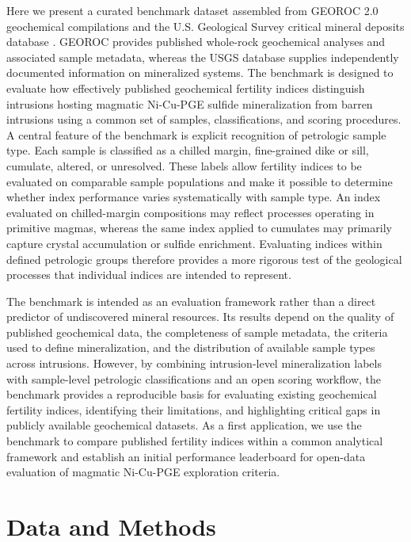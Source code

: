 \documentclass[10pt,twocolumn,letterpaper]{article}
\begin{document}
Here we present a curated benchmark dataset assembled from GEOROC 2.0 geochemical compilations \cite{lehnert2000,worner2024,digis2026} and the U.S. Geological Survey critical mineral deposits database \cite{hammarstrom2023}. GEOROC provides published whole-rock geochemical analyses and associated sample metadata, whereas the USGS database supplies independently documented information on mineralized systems. The benchmark is designed to evaluate how effectively published geochemical fertility indices distinguish intrusions hosting magmatic Ni-Cu-PGE sulfide mineralization from barren intrusions using a common set of samples, classifications, and scoring procedures. A central feature of the benchmark is explicit recognition of petrologic sample type. Each sample is classified as a chilled margin, fine-grained dike or sill, cumulate, altered, or unresolved. These labels allow fertility indices to be evaluated on comparable sample populations and make it possible to determine whether index performance varies systematically with sample type. An index evaluated on chilled-margin compositions may reflect processes operating in primitive magmas, whereas the same index applied to cumulates may primarily capture crystal accumulation or sulfide enrichment. Evaluating indices within defined petrologic groups therefore provides a more rigorous test of the geological processes that individual indices are intended to represent.

The benchmark is intended as an evaluation framework rather than a direct predictor of undiscovered mineral resources. Its results depend on the quality of published geochemical data, the completeness of sample metadata, the criteria used to define mineralization, and the distribution of available sample types across intrusions. However, by combining intrusion-level mineralization labels with sample-level petrologic classifications and an open scoring workflow, the benchmark provides a reproducible basis for evaluating existing geochemical fertility indices, identifying their limitations, and highlighting critical gaps in publicly available geochemical datasets. As a first application, we use the benchmark to compare published fertility indices within a common analytical framework and establish an initial performance leaderboard for open-data evaluation of magmatic Ni-Cu-PGE exploration criteria.

\section{Data and Methods}
\end{document}
